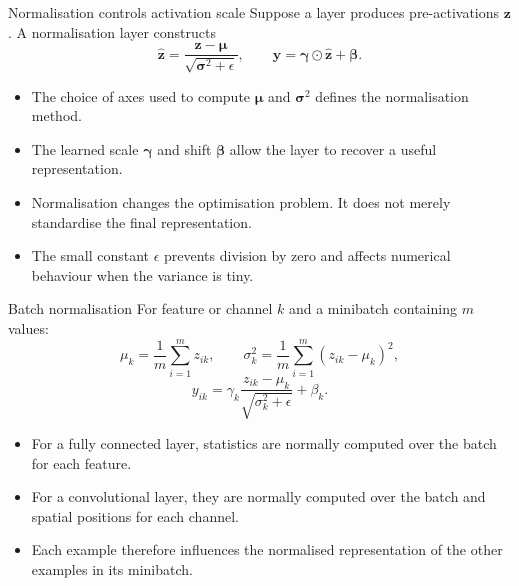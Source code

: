 
\begin{frame}{Normalisation controls activation scale}
Suppose a layer produces pre-activations $\bm z$. A normalisation layer constructs
\[
  \hat{\bm z}
  = \frac{\bm z-\bm\mu}{\sqrt{\bm\sigma^2+\epsilon}},
  \qquad
  \bm y=\bm\gamma\odot\hat{\bm z}+\bm\beta.
\]

\begin{itemize}
  \item The choice of axes used to compute $\bm\mu$ and $\bm\sigma^2$ defines the normalisation method.
  \item The learned scale $\bm\gamma$ and shift $\bm\beta$ allow the layer to recover a useful representation.
  \item Normalisation changes the optimisation problem. It does not merely standardise the final representation.
  \item The small constant $\epsilon$ prevents division by zero and affects numerical behaviour when the variance is tiny.
\end{itemize}
\end{frame}


\begin{frame}{Batch normalisation}
For feature or channel $k$ and a minibatch containing $m$ values:
\[
  \mu_k=\frac{1}{m}\sum_{i=1}^{m}z_{ik},
  \qquad
  \sigma_k^2=\frac{1}{m}\sum_{i=1}^{m}(z_{ik}-\mu_k)^2,
\]
\[
  y_{ik}=\gamma_k
  \frac{z_{ik}-\mu_k}{\sqrt{\sigma_k^2+\epsilon}}+\beta_k.
\]

\begin{itemize}
  \item For a fully connected layer, statistics are normally computed over the batch for each feature.
  \item For a convolutional layer, they are normally computed over the batch and spatial positions for each channel.
  \item Each example therefore influences the normalised representation of the other examples in its minibatch.
\end{itemize}
\end{frame}


